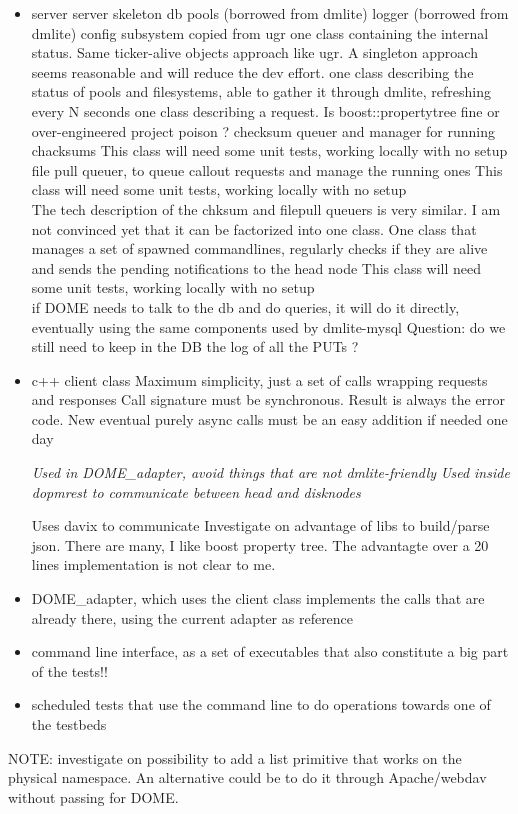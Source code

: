 \documentclass[a4paper,10pt]{scrreprt}
\begin{document}
\begin{itemize}
 \item server
 \subitem server skeleton
 \subitem db pools (borrowed from dmlite)
 \subitem logger (borrowed from dmlite)
 \subitem config subsystem copied from ugr
 \subitem one class containing the internal status. Same ticker-alive objects approach like ugr. A singleton approach seems reasonable and will reduce the dev effort.
 \subsubitem one class describing the status of pools and filesystems, able to gather it through dmlite, refreshing every N seconds
 \subitem one class describing a request. Is boost::propertytree fine or over-engineered project poison ?
 \subitem checksum queuer and manager for running chacksums
  This class will need some unit tests, working locally with no setup\\

 \subitem file pull queuer, to queue callout requests and manage the running ones
 This class will need some unit tests, working locally with no setup\\

 The tech description of the chksum and filepull queuers is very similar. I am not convinced yet that it can be factorized into one class.
 \subitem One class that manages a set of spawned commandlines, regularly checks if they are alive and sends the pending notifications to the head node
 This class will need some unit tests, working locally with no setup\\

 \subitem if DOME needs to talk to the db and do queries, it will do it directly, eventually using the same components used by dmlite-mysql
 \subitem Question: do we still need to keep in the DB the log of all the PUTs ?

 \item c++ client class
 \subitem Maximum simplicity, just a set of calls wrapping requests and responses
 \subitem Call signature must be synchronous. Result is always the error code.
 \subitem New eventual purely async calls must be an easy addition if needed one day

 \subitem \textit{Used in DOME\_adapter, avoid things that are not dmlite-friendly}
 \subitem \textit{Used inside dopmrest to communicate between head and disknodes}

 \subitem Uses davix to communicate
 \subitem Investigate on advantage of libs to build/parse json. There are many, I like boost property tree. The advantagte over a 20 lines implementation is not clear to me.

 \item DOME\_adapter, which uses the client class
 \subitem implements the calls that are already there, using the current adapter as reference

 \item command line interface, as a set of executables that also constitute a big part of the tests!!

 \item scheduled tests that use the command line to do operations towards one of the testbeds

\end{itemize}


NOTE: investigate on possibility to add a list primitive that works on the physical namespace. An alternative could be to do it through Apache/webdav without passing for DOME.
\end{document}
